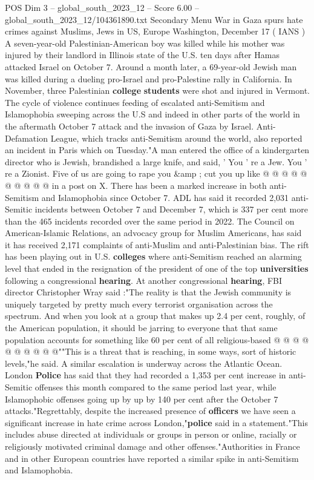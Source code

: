 \begin{textsample}{POS Dim 3 – global\_south\_2023\_12 – Score 6.00 – global\_south\_2023\_12/104361890.txt}  \label{ex:f3_pos_445}
Secondary Menu War in Gaza spurs hate crimes against Muslims, Jews in US, Europe Washington, December 17 ( IANS ) A seven-year-old Palestinian-American boy was killed while his mother was injured by their landlord in Illinois state of the U.S. ten days after Hamas attacked Israel on October 7.
Around a month later, a 69-year-old Jewish man was killed during a dueling pro-Israel and pro-Palestine rally in California.
In November, three Palestinian \textbf{college} \textbf{students} were shot and injured in Vermont.
The cycle of violence continues feeding of escalated anti-Semitism and Islamophobia sweeping across the U.S and indeed in other parts of the world in the aftermath October 7 attack and the invasion of Gaza by Israel.
Anti-Defamation League, which tracks anti-Semitism around the world, also reported an incident in Paris which on Tuesday."A man entered the office of a kindergarten director who is Jewish, brandished a large knife, and said, ' You ' re a Jew.
You ' re a Zionist.
Five of us are going to rape you \&amp ; cut you up like @ @ @ @ @ @ @ @ @ @ in a post on X.
There has been a marked increase in both anti-Semitism and Islamophobia since October 7.
ADL has said it recorded 2,031 anti-Semitic incidents between October 7 and December 7, which is 337 per cent more than the 465 incidents recorded over the same period in 2022.
The Council on American-Islamic Relations, an advocacy group for Muslim Americans, has said it has received 2,171 complaints of anti-Muslim and anti-Palestinian bias.
The rift has been playing out in U.S. \textbf{colleges} where anti-Semitism reached an alarming level that ended in the resignation of the president of one of the top \textbf{universities} following a congressional \textbf{hearing}.
At another congressional \textbf{hearing}, FBI director Christopher Wray said :"The reality is that the Jewish community is uniquely targeted by pretty much every terrorist organisation across the spectrum.
And when you look at a group that makes up 2.4 per cent, roughly, of the American population, it should be jarring to everyone that that same population accounts for something like 60 per cent of all religious-based @ @ @ @ @ @ @ @ @ @""This is a threat that is reaching, in some ways, sort of historic levels,"he said.
A similar escalation is underway across the Atlantic Ocean.
London \textbf{Police} has said that they had recorded a 1,353 per cent increase in anti-Semitic offenses this month compared to the same period last year, while Islamophobic offenses going up by up by 140 per cent after the October 7 attacks."Regrettably, despite the increased presence of \textbf{officers} we have seen a significant increase in hate crime across London,"\textbf{police} said in a statement."This includes abuse directed at individuals or groups in person or online, racially or religiously motivated criminal damage and other offenses."Authorities in France and in other European countries have reported a similar spike in anti-Semitism and Islamophobia.

\end{textsample}
